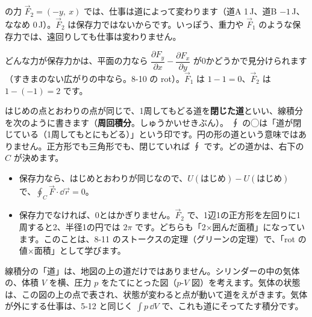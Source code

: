 \bkhatenaref の力 $\vec F_2=(-y,\ x)$ では、仕事は道によって変わります（道A 1\,J、道B $-1$\,J、ななめ 0\,J）。$\vec F_2$ は保存力ではないからです。いっぽう、重力や $\vec F_1$ のような保存力では、遠回りしても仕事は変わりません。

どんな力が保存力かは、平面の力なら $\dfrac{\partial F_y}{\partial x}-\dfrac{\partial F_x}{\partial y}$ が0かどうかで見分けられます（すきまのない広がりの中なら。8-10 の rot）。$\vec F_1$ は $1-1=0$、$\vec F_2$ は $1-(-1)=2$ です。

はじめの点とおわりの点が同じで、1周してもどる道を\textbf{閉じた道}といい、線積分を次のように書きます（\textbf{周回積分}。しゅうかいせきぶん）。
∮ の◯は「道が閉じている（1周してもとにもどる）」という印です。円の形の道という意味ではありません。正方形でも三角形でも、閉じていれば ∮ です。どの道かは、右下の $C$ が決めます。
\begin{itemize}[leftmargin=1.2\zw, itemsep=2pt, topsep=0pt, label={\color{\bkTT}●}]
\item 保存力なら、はじめとおわりが同じなので、$U(\text{はじめ})-U(\text{はじめ})$ で、$\oint_C\vec F\cdot\dd\vec r=0$。
\item 保存力でなければ、0とはかぎりません。$\vec F_2$ で、1辺1の正方形を左回りに1周すると2、半径1の円では $2\pi$ です。どちらも「2×囲んだ面積」になっています。このことは、8-11 のストークスの定理（グリーンの定理）で、「rot の値×面積」として学びます。
\end{itemize}


\label{bk:8-7:pv}線積分の「道」は、地図の上の道だけではありません。シリンダーの中の気体の、体積 $V$ を横、圧力 $p$ をたてにとった図（$p$-$V$ 図）を考えます。気体の状態は、この図の上の点で表され、状態が変わると点が動いて道をえがきます。気体が外にする仕事は、5-12 と同じく $\int p\,\dd V$ で、これも道にそってたす積分です。

